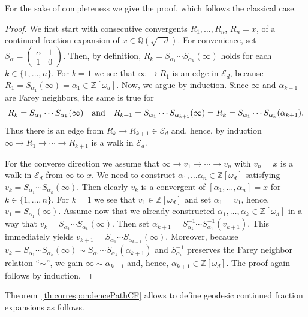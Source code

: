 \documentclass[graybox]{svmult}
\begin{document}
For the sake of completeness we give the proof, which follows the classical case.

\begin{proof}
We first start with consecutive convergents $R_1,\ldots, R_n$, $R_n=x$, of a continued fraction expansion of $x \in \mathbb{Q}(\sqrt{-d})$. For convenience, set 
$S_{\alpha}= \begin{pmatrix}
\alpha &1\\
1&0
\end{pmatrix}$.
Then, by definition, 
$R_k=S_{\alpha_1}\cdots S_{\alpha_k}(\infty)$ holds for each $k\in\{1,\ldots,n\}$. For $k=1$ we  see that $\infty \to  R_1$ is an edge in $\mathcal{E}_{d}$, because $R_1=S_{\alpha_1}(\infty)=\alpha_1\in \mathbb{Z}[\omega_{d}]$. Now, we argue by induction. Since $\infty$ and $\alpha_{k+1}$ are Farey neighbors, the same is true for  
\[
R_k=S_{\alpha_1} \cdots S_{ \alpha_k}(\infty) \quad\hbox{and}\quad
 R_{k+1}=S_{\alpha_1} \cdots S_{\alpha_{k+1}}(\infty)=R_k=S_{\alpha_1} \cdots 
 S_{\alpha_k}(\alpha_{k+1}).
\]
Thus there is an edge from $R_k\to R_{k+1} \in \mathcal{E}_d$ and, hence, by induction $\infty \to  R_1 \to \cdots \to  R_{k+1}$ is a walk in $\mathcal{E}_{d}$.

For the converse direction we assume that $\infty \to  v_1 \to \cdots \to  v_n$ with $v_n=x$ is a walk in $\mathcal{E}_{d}$ from $\infty$ to $x$. We need to construct 
$\alpha_1,\ldots \alpha_n \in \mathbb{Z}[\omega_d]$ satisfying $v_k=S_{\alpha_1} \cdots 
S_{\alpha_k}(\infty) $. 
Then clearly $v_k$ is a convergent of  $[\alpha_1,\ldots, \alpha_n]=x$ for $k\in\{1,\ldots,n\}$. For $k=1$ we see that $v_1\in \mathbb{Z}[\omega_d]$ and set $\alpha_1=v_1$, hence, $v_1=S_{\alpha_1}(\infty)$. Assume now that we already constructed $\alpha_1,\ldots,\alpha_k\in \mathbb{Z}[\omega_d]$ in a way that 
$v_k=S_{\alpha_1} \cdots S_{\alpha_k}(\infty)$.  Then set $\alpha_{k+1}=S_{\alpha_k}^{-1}\cdots S_{\alpha_1}^{-1}(v_{k+1})$. This immediately yields $v_{k+1}=S_{\alpha_1} \cdots 
S_{\alpha_{k+1}}(\infty)$. Moreover, because $v_k =S_{\alpha_1} \cdots S_{\alpha_{k}}(\infty)
\sim S_{\alpha_1} \cdots S_{\alpha_{k}}(\alpha_{k+1})$ and $S_{\alpha_i}^{-1}$ preserves the Farey neighbor relation ``$\sim$'', we gain $\infty \sim \alpha_{k+1}$ and, hence, 
$\alpha_{k+1}\in \mathbb{Z}[\omega_d]$. The proof again follows by induction.
\end{proof}

Theorem~\ref{th:correspondencePathCF} allows to define  geodesic continued fraction expansions as follows.
 
\end{document}
